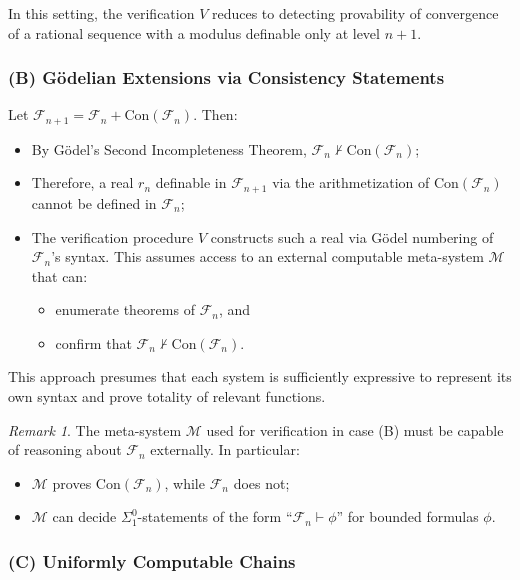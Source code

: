 \documentclass[12pt]{article}
\theoremstyle{definition}
\theoremstyle{plain}
\theoremstyle{remark}
\newtheorem*{remark}{Remark}
\begin{document}
In this setting, the verification \( V \) reduces to detecting provability of convergence of a rational sequence with a modulus definable only at level \( n+1 \).

\subsubsection*{(B) Gödelian Extensions via Consistency Statements}

Let \( \mathcal{F}_{n+1} = \mathcal{F}_n + \mathrm{Con}(\mathcal{F}_n) \). Then:
\begin{itemize}
    \item By Gödel’s Second Incompleteness Theorem, \( \mathcal{F}_n \not\vdash \mathrm{Con}(\mathcal{F}_n) \);
    \item Therefore, a real \( r_n \) definable in \( \mathcal{F}_{n+1} \) via the arithmetization of \( \mathrm{Con}(\mathcal{F}_n) \) cannot be defined in \( \mathcal{F}_n \);
    \item The verification procedure \( V \) constructs such a real via Gödel numbering of \( \mathcal{F}_n \)’s syntax. This assumes access to an external computable meta-system \( \mathcal{M} \) that can:
    \begin{itemize}
      \item enumerate theorems of \( \mathcal{F}_n \), and
      \item confirm that \( \mathcal{F}_n \not\vdash \mathrm{Con}(\mathcal{F}_n) \).
    \end{itemize}
\end{itemize}

This approach presumes that each system is sufficiently expressive to represent its own syntax and prove totality of relevant functions.

\begin{remark}
The meta-system \( \mathcal{M} \) used for verification in case (B) must be capable of reasoning about \( \mathcal{F}_n \) externally. In particular:
\begin{itemize}
    \item \( \mathcal{M} \) proves \( \mathrm{Con}(\mathcal{F}_n) \), while \( \mathcal{F}_n \) does not;
    \item \( \mathcal{M} \) can decide \( \Sigma^0_1 \)-statements of the form “\( \mathcal{F}_n \vdash \phi \)” for bounded formulas \( \phi \).
\end{itemize}
\end{remark}

\subsubsection*{(C) Uniformly Computable Chains}
\end{document}
